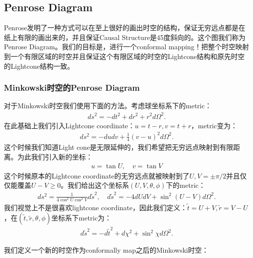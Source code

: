 \subsection{Penrose Diagram}

Penrose发明了一种方式可以在至上很好的画出时空的结构，保证无穷远点都是在纸上有限的画出来的，并且保证Causal
Structure是45度斜向的。这个图我们称为Penrose Diagram。我们的目标是，进行一个conformal
mapping！把整个时空映射到一个有限区域的时空并且保证这个有限区域的时空的Lightcone结构和原先时空的Lightcone结构一致。

\subsubsection{Minkowski时空的Penrose Diagram}

\bigskip
{}

对于Minkowski时空我们使用下面的方法。考虑球坐标系下的metric：
\begin{align}
  ds^2=-dt^2+dr^2+r^2d\Omega^2.
\end{align}
在此基础上我们引入Lightcone coordinate：$ u=t-r, v=t+r $，metric变为：
\begin{align}
  ds^2=-dudv+\frac{1}{4}(v-u)^2d\Omega^2.
\end{align}
这个时候我们知道Light cone是无限延伸的，我们希望把无穷远点映射到有限距离。为此我们引入新的坐标：
\begin{align}
  u=\tan U,\quad v=\tan V
\end{align}
这个时候原本的Lightcone coordinate的无穷远点就被映射到了$ U,V = \pm \pi/2 $并且仅仅能覆盖$ U-V
\geq 0 $。我们给出这个坐标系$ (U,V,\theta, \phi) $下的metric：
\begin{align}
  ds^2=\frac{1}{4\cos^2U\cos^2V}d\tilde{s}^2,\quad
  d\tilde{s}^2=-4dUdV+\sin^2(U-V)d\Omega^2.
\end{align}
我们视觉上不是很喜欢lightcone coordinate，因此我们定义：$ \tilde{t} = U+V , \tilde{r} =
V-U $，在$ (\tilde{t}, \tilde{r}, \theta, \phi) $坐标系下metric为：
\begin{align}
  d\tilde{s}^2=-d\tilde{t}^2+d\chi^2+\sin^2\chi d\Omega^2.
\end{align}

\bigskip
{}

我们定义一个新的时空作为conformally map之后的Minkowski时空：

